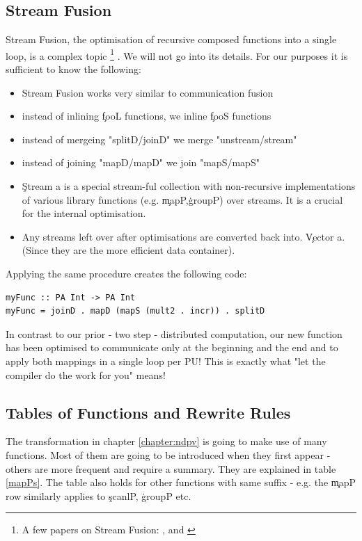     
  \subsection{Stream Fusion}
    Stream Fusion, the optimisation of recursive composed functions
    into a single loop, is a complex topic
    \footnote{A few papers on Stream Fusion:
    \cite{GenVectorFusion2013}, \cite{Fusion2007} and \cite{ArrayFusion2001Chakravarty}
    }
    . We will not go into its details.
    For our purposes it is sufficient to know the following:
    \begin{itemize}
      \item Stream Fusion works very similar to communication fusion
      \item instead of inlining \c{fooL} functions, we inline \c{fooS} functions
      \item instead of mergeing "splitD/joinD" we merge "unstream/stream"
      \item instead of joining "mapD/mapD" we join "mapS/mapS"
      \item \c{Stream a} is a special stream-ful collection with
        non-recursive implementations of various library functions (e.g. \c{mapP},\c{groupP})
        over streams. It is a crucial for the internal optimisation.
      \item Any streams left over after optimisations are converted back into.
        \c{Vector a}. (Since they are the more efficient data container).
    \end{itemize}
    Applying the same procedure creates the following code:
    \begin{lstlisting}
myFunc :: PA Int -> PA Int
myFunc = joinD . mapD (mapS (mult2 . incr)) . splitD
    \end{lstlisting}
    In contrast to our prior - two step - distributed computation,
    our new function has been optimised to communicate only
    at the beginning and the end and to apply both mappings
    in a single loop per PU!
    This is exactly what "let the compiler do the work for you" means!
    
  \subsection{Tables of Functions and Rewrite Rules}
    The transformation in chapter \ref{chapter:ndpv} is going to
    make use of many functions. Most of them are going to be
    introduced when they first appear - others are more frequent
    and require a summary. They are explained in table \ref{mapPs}.
    The table also holds for other functions with same suffix - e.g.
    the \c{mapP} row similarly applies to \c{scanlP}, \c{groupP} etc.
    
